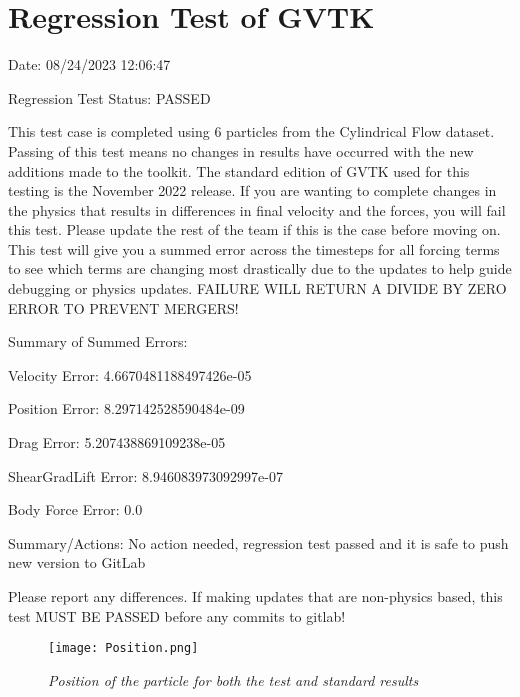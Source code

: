 \documentclass{article}
\begin{document}
\section{Regression Test of GVTK}
Date: 08/24/2023 12:06:47

\vspace{5pt}

\noindent Regression Test Status: PASSED

\vspace{5pt}

\noindent This test case is completed using 6 particles from the Cylindrical Flow dataset. Passing of this test means no changes in results have occurred with the new additions made to the toolkit.
The standard edition of GVTK used for this testing is the November 2022 release. If you are wanting to complete changes in the physics that results in differences in final velocity and the forces,
you will fail this test. Please update the rest of the team if this is the case before moving on. This test will give you a summed error across the timesteps for all forcing terms to see which terms
are changing most drastically due to the updates to help guide debugging or physics updates. FAILURE WILL RETURN A DIVIDE BY ZERO ERROR TO PREVENT MERGERS!



\vspace{5pt}

\noindent Summary of Summed Errors:
\vspace{5pt}

Velocity Error: 4.6670481188497426e-05

Position Error: 8.297142528590484e-09

Drag Error: 5.207438869109238e-05

ShearGradLift Error: 8.946083973092997e-07

Body Force Error: 0.0

\vspace{5pt}

\noindent Summary/Actions: No action needed, regression test passed and it is safe to push new version to GitLab

\vspace{5pt}

\noindent Please report any differences. If making updates that are non-physics based, this test MUST BE PASSED before any commits to gitlab!

\begin{figure}[htbp]
\centering
\texttt{[image: Position.png]}
\caption{\textit{Position of the particle for both the test and standard results}}
\label{fig:postion}
\end{figure}
\end{document}
